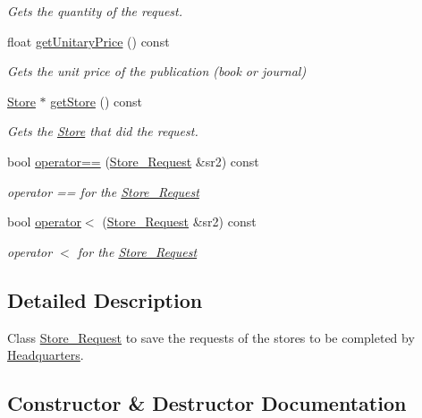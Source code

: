 \begin{DoxyCompactItemize}
\begin{DoxyCompactList}\small\item\em Gets the quantity of the request. \end{DoxyCompactList}\item 
float \hyperlink{class_store___request_a93fc46718e228136422fd03dd36032aa}{get\+Unitary\+Price} () const
\begin{DoxyCompactList}\small\item\em Gets the unit price of the publication (book or journal) \end{DoxyCompactList}\item 
\hyperlink{class_store}{Store} $\ast$ \hyperlink{class_store___request_ae288d0d554786fc94f62f432cfe8171a}{get\+Store} () const
\begin{DoxyCompactList}\small\item\em Gets the \hyperlink{class_store}{Store} that did the request. \end{DoxyCompactList}\item 
bool \hyperlink{class_store___request_acaf1134a64475cff2641234e32b0b263}{operator==} (\hyperlink{class_store___request}{Store\+\_\+\+Request} \&sr2) const
\begin{DoxyCompactList}\small\item\em operator == for the \hyperlink{class_store___request}{Store\+\_\+\+Request} \end{DoxyCompactList}\item 
bool \hyperlink{class_store___request_a1536252134957a2d3bb9234822265b8d}{operator$<$} (\hyperlink{class_store___request}{Store\+\_\+\+Request} \&sr2) const
\begin{DoxyCompactList}\small\item\em operator $<$ for the \hyperlink{class_store___request}{Store\+\_\+\+Request} \end{DoxyCompactList}\end{DoxyCompactItemize}


\subsection{Detailed Description}
Class \hyperlink{class_store___request}{Store\+\_\+\+Request} to save the requests of the stores to be completed by \hyperlink{class_headquarters}{Headquarters}. 

\subsection{Constructor \& Destructor Documentation}
\mbox{\label{class_store___request_a97c16609ede5914e504b87a4cb7f085c}} 
